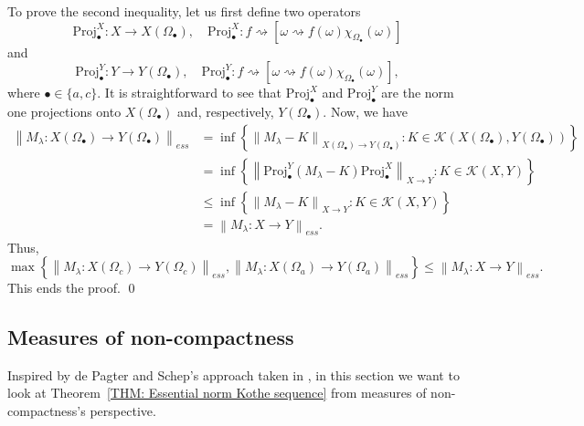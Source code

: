 \documentclass[11pt]{amsart}
\theoremstyle{definition}
\theoremstyle{definition}
\theoremstyle{definition}
\theoremstyle{definition}
\theoremstyle{definition}
\theoremstyle{definition}
\theoremstyle{definition}
\theoremstyle{definition}
\numberwithin{equation}{section}
\numberwithin{equation}{section}
\numberwithin{equation}{section}
\theoremstyle{definition}
\theoremstyle{definition}
\theoremstyle{definition}
\theoremstyle{definition}
\theoremstyle{definition}
\theoremstyle{definition}
\newcommand{\norm}[1]{\left\lVert#1\right\rVert}
\renewenvironment{proof}{\noindent {\bf Proof.}}{\qed}
\begin{document}
\begin{proof}
	To prove the second inequality, let us first define two operators
	\begin{equation*}
		\text{Proj}_{\bullet}^X \colon X \rightarrow X(\Omega_{\bullet}), \quad
		\text{Proj}_{\bullet}^X \colon f \rightsquigarrow \left[ \omega \rightsquigarrow f(\omega)\chi_{\Omega_{\bullet}}(\omega) \right]
	\end{equation*}
	and
	\begin{equation*}
		\text{Proj}_{\bullet}^Y \colon Y \rightarrow Y(\Omega_{\bullet}), \quad
		\text{Proj}_{\bullet}^Y \colon f \rightsquigarrow \left[ \omega \rightsquigarrow f(\omega)\chi_{\Omega_{\bullet}}(\omega) \right],
	\end{equation*}
	where $\bullet \in \{a, c\}$.
	It is straightforward to see that $\text{Proj}_{\bullet}^X$ and $\text{Proj}_{\bullet}^Y$ are the norm one projections
	onto $X(\Omega_{\bullet})$ and, respectively, $Y(\Omega_{\bullet})$.
	Now, we have
	\begin{align*}
		\norm{M_{\lambda} \colon X(\Omega_{\bullet}) \rightarrow Y(\Omega_{\bullet})}_{ess}
			& = \inf \left\{ \norm{M_{\lambda} - K}_{X(\Omega_{\bullet}) \rightarrow Y(\Omega_{\bullet})} \colon K \in \mathscr{K}(X(\Omega_{\bullet}),Y(\Omega_{\bullet})) \right\} \\
			& = \inf \left\{ \norm{\text{Proj}_{\bullet}^Y(M_{\lambda} - K)\text{Proj}_{\bullet}^X}_{X \rightarrow Y} \colon K \in \mathscr{K}(X,Y) \right\} \\
			& \leqslant \inf \left\{ \norm{M_{\lambda} - K}_{X \rightarrow Y} \colon K \in \mathscr{K}(X,Y) \right\} \\
			& = \norm{M_{\lambda} \colon X \rightarrow Y}_{ess}.
	\end{align*}
	Thus,
	\begin{equation*}
		\max \left\{ \norm{M_{\lambda} \colon X(\Omega_c) \rightarrow Y(\Omega_c)}_{ess}, \norm{M_{\lambda} \colon X(\Omega_a) \rightarrow Y(\Omega_a)}_{ess} \right\}
			\leqslant \norm{M_{\lambda} \colon X \rightarrow Y}_{ess}.
	\end{equation*}
	This ends the proof.
\end{proof}

\subsection{Measures of non-compactness}
Inspired by de Pagter and Schep's approach taken in \cite{PS88}, in this section we want to look at Theorem~\ref{THM: Essential norm Kothe sequence}
from measures of non-compactness's perspective.
\end{document}
